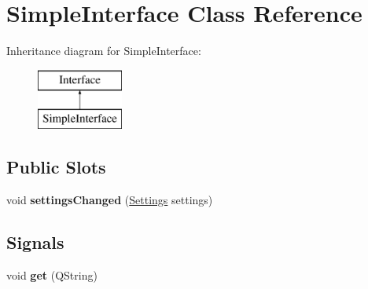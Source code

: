 \hypertarget{classSimpleInterface}{
\section{SimpleInterface Class Reference}
\label{classSimpleInterface}
}
Inheritance diagram for SimpleInterface:\begin{figure}[H]
\begin{center}
\leavevmode
\includegraphics[height=2cm]{classSimpleInterface}
\end{center}
\end{figure}
\subsection*{Public Slots}
\begin{DoxyCompactItemize}
\item 
\hypertarget{classSimpleInterface_a5a879c62260177f25f0d860938725a4f}{
void {\bfseries settingsChanged} (\hyperlink{classSettings}{Settings} settings)}
\label{classSimpleInterface_a5a879c62260177f25f0d860938725a4f}

\end{DoxyCompactItemize}
\subsection*{Signals}
\begin{DoxyCompactItemize}
\item 
\hypertarget{classSimpleInterface_a84d1dcca4469f7b955ce029fd2548c37}{
void {\bfseries get} (QString)}
\label{classSimpleInterface_a84d1dcca4469f7b955ce029fd2548c37}

\end{DoxyCompactItemize}
